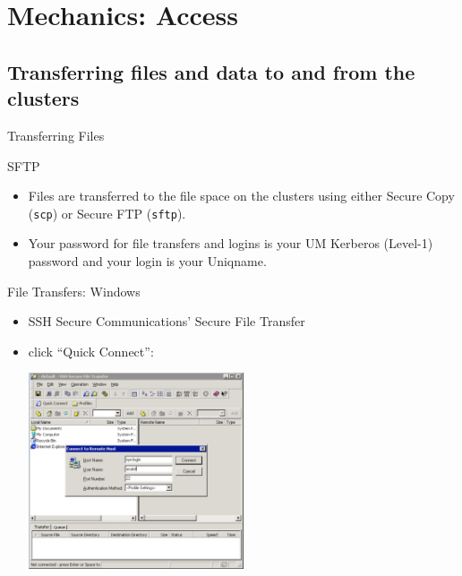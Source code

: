 \documentclass{beamer}
\begin{document}
  \section{Mechanics: Access}
  \subsection{Transferring files and data to and from the clusters}
  \begin{frame}{Transferring Files}
   \begin{block}{SFTP}
    \begin{itemize}
    \item Files are transferred to the file space on the clusters using either
      Secure Copy (\texttt{scp}) or Secure FTP (\texttt{sftp}).
    \item Your password for file transfers and logins is your UM Kerberos (Level-1)
      password and your login is your Uniqname.
    \end{itemize}
   \end{block}
  \end{frame}
  \begin{frame}{File Transfers: Windows}
    \begin{itemize}
    \item SSH Secure Communications' Secure File Transfer
    \item click ``Quick Connect'': \\
      \begin{center}\includegraphics[width=2.5in]{ssh-sftp-login}\end{center}
    \end{itemize}
  \end{frame}
\end{document}
